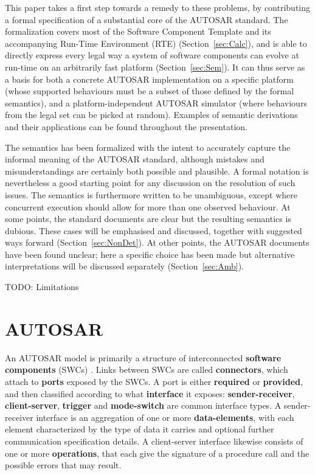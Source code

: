 \documentclass[10pt,conference]{IEEEtran}
\begin{document}
This paper takes a first step towards a remedy to these problems, by contributing a formal specification of a substantial core of the AUTOSAR standard. The formalization covers most of the Software Component Template and its accompanying Run-Time Environment (RTE) (Section~\ref{sec:Calc}), and is able to directly express every legal way a system of software components can evolve at run-time on an arbitrarily fast platform (Section~\ref{sec:Sem}). It can thus serve as a basis for both a concrete AUTOSAR implementation on a specific platform (whose supported behaviours must be a subset of those defined by the formal semantics), and a platform-independent AUTOSAR simulator (where behaviours from the legal set can be picked at random). Examples of semantic derivations and their applications can be found throughout the presentation.

The semantics has been formalized with the intent to accurately capture the informal meaning of the AUTOSAR standard, although mistakes and misunderstandings are certainly both possible and plausible. A formal notation is nevertheless a good starting point for any discussion on the resolution of such issues. The semantics is furthermore written to be unambiguous, except where concurrent execution should allow for more than one observed behaviour. At some points, the standard documents are clear but the resulting semantics is dubious. These cases will be emphasised and discussed, together with suggested ways forward (Section~\ref{sec:NonDet}). At other points, the AUTOSAR documents have been found unclear; here a specific choice has been made but alternative interpretations will be discussed separately (Section~\ref{sec:Amb}).

TODO: Limitations


\section{AUTOSAR}
\label{sec:autosar}

An AUTOSAR model is primarily a structure of interconnected \textbf{software components} (SWCs) \cite{AR:SWC}. Links between SWCs are called \textbf{connectors}, which attach to \textbf{ports} exposed by the SWCs. A port is either \textbf{required} or \textbf{provided}, and then classified according to what \textbf{interface} it exposes: \textbf{sender-receiver}, \textbf{client-server}, \textbf{trigger} and \textbf{mode-switch} are common interface types. A sender-receiver interface is an aggregation of one or more \textbf{data-elements}, with each element characterized by the type of data it carries and optional further communication specification details. A client-server interface likewise consists of one or more \textbf{operations}, that each give the signature of a procedure call and the possible errors that may result.
\end{document}
